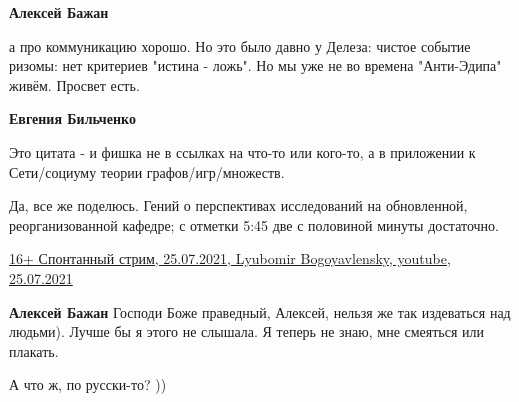 \begin{itemize}
\begin{itemize}
\textbf{Алексей Бажан} 

а про коммуникацию хорошо. Но это было давно у Делеза: чистое событие ризомы:
нет критериев "истина - ложь". Но мы уже не во времена "Анти-Эдипа" живём.
Просвет есть.

 
\textbf{Евгения Бильченко} 

Это цитата - и фишка не в ссылках на что-то или
кого-то, а в приложении к Сети/социуму теории графов/игр/множеств.

\end{itemize}

 

Да, все же поделюсь. Гений о перспективах исследований на обновленной,
реорганизованной кафедре; с отметки 5:45 две с половиной минуты достаточно.

\href{https://www.youtube.com/watch?v=ycvIn9RMFAc&t=345s}{%
16+ Спонтанный стрим, 25.07.2021, Lyubomir Bogoyavlensky, youtube, 25.07.2021%
}

\begin{itemize}
 
\textbf{Алексей Бажан} Господи Боже праведный, Алексей, нельзя же так издеваться над людьми). Лучше бы я этого не слышала. Я теперь не знаю, мне смеяться или плакать.

 
А что ж, по русски-то? ))

 

\end{itemize}
\end{itemize}
